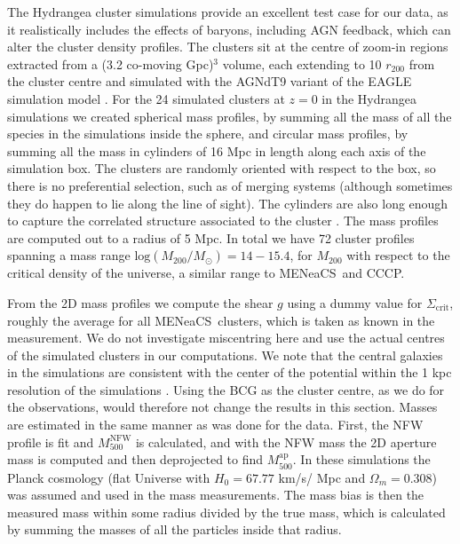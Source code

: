 \documentclass[useAMS,usenatbib]{mnras}
\newcommand{\mn}{MENeaCS}
\begin{document}
The Hydrangea cluster simulations \citep{bahe17, barnes17} provide an excellent test case for our data, as it realistically includes the effects of baryons, including AGN feedback, which can alter the cluster density profiles. The clusters sit at the centre of zoom-in regions extracted from a (3.2 co-moving Gpc)$^3$ volume, each extending to 10 $r_{200}$ from the cluster centre and simulated with the AGNdT9 variant of the EAGLE simulation model  \citep{schaye15, crain15}. For the 24 simulated clusters at $z=0$ in the Hydrangea simulations we created spherical mass profiles, by summing all the mass of all the species in the simulations inside the sphere, and circular mass profiles, by summing all the mass in cylinders of 16 Mpc  in length along each axis of the simulation box. The clusters are randomly oriented with respect to the box, so there is no preferential selection, such as of merging systems (although sometimes they do happen to lie along the line of sight). The cylinders are also long enough to capture the correlated structure associated to the cluster \citep{becker11}. The mass profiles are computed out to a radius of 5 Mpc. In total we have 72 cluster profiles spanning a mass range  $\mathrm{log}(M_{200}/M_\odot) = 14-15.4$, for $M_{200}$ with respect to the critical density of the universe, a similar range to \mn \ and CCCP.

From the 2D mass profiles we compute the shear $g$ using a dummy value for $\Sigma_\mathrm{crit}$, roughly the average for all \mn \ clusters, which is taken as known in the measurement. We do not investigate miscentring here and use the actual centres of the simulated clusters in our computations. We note that the central galaxies in the simulations are consistent with the center of the potential within the 1 kpc resolution of the simulations \citep{he19}. Using the BCG as the cluster centre, as we do for the observations, would therefore not change the results in this section. Masses are estimated in the same manner as was done for the data. First, the NFW profile is fit and $M^\mathrm{NFW}_{500}$ is calculated, and with the NFW mass the 2D aperture mass is computed and then deprojected to find $M^\mathrm{ap}_{500}$. In these simulations the Planck cosmology (flat Universe with $H_0 =67.77$ km/s/ Mpc and $\Omega_m =0.308$) was assumed and used in the mass measurements. The mass bias is then the measured mass within some radius divided by the true mass, which is calculated by summing the masses of all the particles inside that radius.
\end{document}
